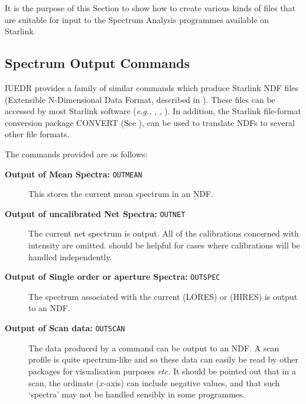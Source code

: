 It is the purpose of this Section to show how to create various kinds of
files that are suitable for input to the Spectrum Analysis programmes
available on Starlink.


\subsection{Spectrum Output Commands}

IUEDR provides a family of similar commands which produce Starlink NDF files
(Extensible N-Dimen\-sional Data Format, described in
)\@.  These files
can be accessed by most Starlink software ({\it{e.g.,}} ,
,
)\@.
In addition, the Starlink file-format conversion package CONVERT (See
),
can be used to translate NDFs to several other file formats.

The commands provided are as follows:

\begin{description}

\item [{\bf Output of Mean Spectra:} {\tt OUTMEAN}]
      This stores the current mean spectrum in an NDF\@.

\item [{\bf Output of uncalibrated Net Spectra:} {\tt OUTNET}]
      The current net spectrum is output.
      All of the calibrations concerned with intensity are omitted.
       should be helpful for
      cases where calibrations will be handled independently.

\item [{\bf Output of Single order or aperture Spectra:} {\tt OUTSPEC}]
      The spectrum
      associated with the current 
      (LORES) or  (HIRES) is output to an
      NDF\@.

\item [{\bf Output of Scan data:} {\tt OUTSCAN}]
      The data produced by a  command can be 
      output to an NDF\@.  A scan profile is quite
      spectrum-like and so these data can easily be read by other packages for
      visualisation purposes {\it etc.}  It should be pointed out that in a 
      scan, the ordinate ($x$-axis) can include negative values, and that such
      `spectra' may not be handled sensibly in some programmes.

\end{description}

